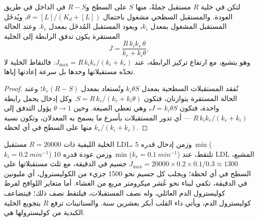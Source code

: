 \begin{proposition}\label{prop:b3:membrane-traffic:uptake}
لتكن في خلية $R$ مستقبل جملةً، منها $S$ على السطح
و$R - S$ في الداخل في طريق العودة. والمستقبل السطحي مشغول
باحتمال $\theta = [L]/(K_{d} + [L])$، ويُدخَل المستقبل المشغول
بمعدل $k_{i}$، ويعود المستقبل المُدخَل بمعدل
$k_{r}$. وعند الحالة المستقرة يكون تدفق الرابطة إلى الخلية
\[
J = \frac{R\,k_{i}k_{r}\,\theta}{k_{r} + k_{i}\theta},
\]
وهو يتشبع، مع ارتفاع تركيز الرابطة، عند $J_{\max} =
R\,k_{i}k_{r}/(k_{i} + k_{r})$: فالتقاط الخلية لا تحدّه
مستقبلاتها وحدها بل سرعة إعادتها إياها.
\end{proposition}
\begin{proof}
تُفقد المستقبلات السطحية بمعدل $k_{i}\theta S$ وتُستعاد بمعدل
$k_{r}(R - S)$؛ وعند الحالة المستقرة يتوازنان، فتكون $S = R\,k_{r}/(k_{r}
+ k_{i}\theta)$. وكل إدخال يحمل رابطة واحدة، فتكون $J =
k_{i}\theta S$، وهي تعطي الصيغة. وحين $\theta \to 1$ يؤول التدفق
إلى $R\,k_{i}k_{r}/(k_{r} + k_{i})$ --- أي تدور المستقبلات بأسرع
ما يسمح به المعدلان، وتكون نسبة $k_{r}/(k_{i} + k_{r})$ منها
على السطح في أي لحظة.
\end{proof}

\begin{example}\label{ex:b3:membrane-traffic:ldl}
الخلية الليفية ذات $R = \num{20000}$ مستقبل LDL، وزمن إدخال
قدره \qty{5}{min} ($k_{i} = \qty{0.2}{min^{-1}}$) وزمن عودة
قدره \qty{10}{min} ($k_{r} = \qty{0.1}{min^{-1}}$) تلتقط، عند LDL
المشبع، $J_{\max} = \num{20000}\times 0.2\times 0.1/0.3 \approx 1300$
جسيم في الدقيقة، مع ثلث مستقبلاتها على السطح في
أي لحظة؛ ويجلب كل جسيم نحو \num{1500} جزيء من
الكوليسترول، أي مليونين في الدقيقة، تكفي لبناء نحو عُشر
ميكرومتر مربع من الغشاء. أما متغاير اللواقح لفرط
كوليسترول الدم العائلي، وله نصف المستقبلات، فيلتقط نصف ذلك؛
فيتضاعف كوليسترول الدم، ويأتي داء القلب أبكر بعشرين سنة.
والستاتينات ترفع $R$ بتجويع الخلية الكبدية من كوليسترولها
هي.
\end{example}

